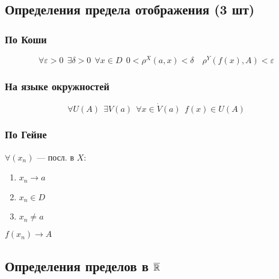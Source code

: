 \subsection{Определения предела отображения (3 шт)}

\subsubsection{По Коши}
    $$\forall \varepsilon>0 \ \ \exists \delta>0 \ \ \forall x\in D \ \ 0<\rho^X(a,x)<\delta \quad \rho^Y(f(x), A) < \varepsilon$$
\subsubsection{На языке окружностей}
    $$\forall U(A) \ \ \exists V(a) \ \ \forall x\in \dot V(a) \ \ f(x)\in U(A)$$
\subsubsection{По Гейне}
    $\forall (x_n)$ --- посл. в $X$:
    \begin{enumerate}
        \item $x_n\to a$
        \item $x_n\in D$
        \item $x_n\not = a$
    \end{enumerate}
    $f(x_n)\to A$

\subsection{Определения пределов в $\overline{\operatorname*{\mathbb{R}}}$}

